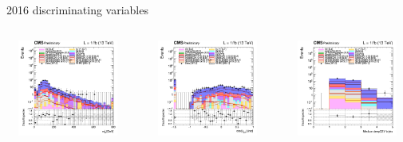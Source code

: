 \documentclass[8pt]{beamer}
\begin{document}
\begin{frame}{2016 discriminating variables}
\begin{columns}
\begin{column}{0.33\textwidth}
\begin{center}
    		\end{center}		
		\end{column}
\end{columns}
\begin{columns}
		\begin{column}{0.33\textwidth}
			\begin{center}
     			\includegraphics[width=1.0\textwidth, height=90pt]{figs/2016/log_cratio_topCR_ll_mblt.png}
    		\end{center}		
		\end{column}
		\begin{column}{0.33\textwidth}
			\begin{center}
     			\includegraphics[width=1.0\textwidth, height=90pt]{figs/2016/log_cratio_topCR_ll_costhetall.png}
    		\end{center}		
		\end{column}
		\begin{column}{0.33\textwidth}
			\begin{center}
     			\includegraphics[width=1.0\textwidth, height=90pt]{figs/2016/log_cratio_topCR_ll_nbjet.png}
    		\end{center}		
		\end{column}
\end{columns} \vfill
\end{frame}
\end{document}
